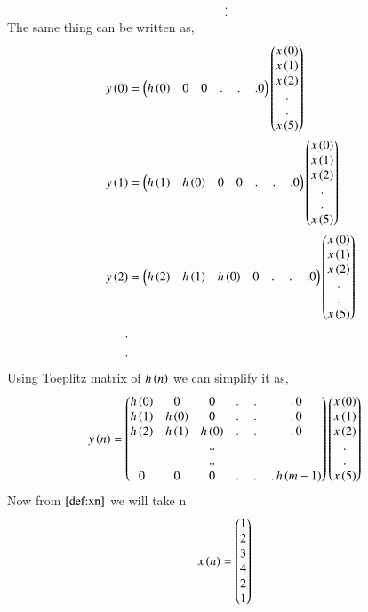 \documentclass[journal,12pt,twocolumn]{IEEEtran}
\renewcommand\thesection{\arabic{section}}
\begin{document}
\begin{enumerate}[label=\thesection.\arabic*]
\begin{align}
      . \nonumber&\\ 
      .& \nonumber
     \end{align}
    The same thing can be written as,
     \begin{align}
       y\left(0\right) &= \begin{pmatrix}h\left(0\right) & 0 & 0 &.\,&.\,&.0\end{pmatrix}\begin{pmatrix}x\left(0\right)\\x\left(1\right)\\x\left(2\right)\\ . \\.\\x\left(5\right)\end{pmatrix}\\
       y\left(1\right) &= \begin{pmatrix}h\left(1\right) & h\left(0\right) & 0 & 0 &.\,&.\,&.0\end{pmatrix}\begin{pmatrix}x\left(0\right)\\x\left(1\right)\\x\left(2\right)\\ . \\.\\x\left(5\right)\end{pmatrix}\\
       y\left(2\right) &= \begin{pmatrix}h\left(2\right) & h\left(1\right) & h\left(0\right) & 0& .\,&.\,&.0\end{pmatrix}\begin{pmatrix}x\left(0\right)\\x\left(1\right)\\x\left(2\right)\\ . \\.\\x\left(5\right)\end{pmatrix}\\
       . & \nonumber \\
       .& \nonumber
     \end{align}
    Using Toeplitz matrix of $h\left(n\right)$ we can simplify it as,
     \begin{align}
       y\left(n\right) &= \begin{pmatrix}h\left(0\right) & 0 & 0 &.\,&.\,&.\,0 \\
                           h\left(1\right) & h\left(0\right) & 0 & .\,&.\,&.\,0 \\
                           h\left(2\right) & h\left(1\right) & h\left(0\right) & .\,&.\,&.\,0 \\
                            &&..\\&&..\\ 0 & 0 &  0 &.\,&.\,&.\, h\left(m-1\right)\end{pmatrix}\begin{pmatrix}x\left(0\right)\\x\left(1\right)\\x\left(2\right)\\ . \\.\\x\left(5\right)\end{pmatrix}\label{eq:ynconv_toep}
     \end{align}
     Now from $\eqref{def:xn}$ we will take n 
      \begin{align}
          x\brak{n} &= \myvec{1\\2\\3\\4\\2\\1}

\end{align}
\end{enumerate}
\end{document}
